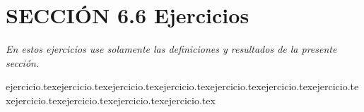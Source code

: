 
\section*{SECCIÓN 6.6 \quad Ejercicios}

\noindent \textit{En estos ejercicios use solamente las definiciones y resultados de la presente sección.}

\begin{enumerate}
    {ejercicio.tex}{ejercicio.tex}{ejercicio.tex}{ejercicio.tex}{ejercicio.tex}{ejercicio.tex}{ejercicio.tex}{ejercicio.tex}{ejercicio.tex}{ejercicio.tex}{ejercicio.tex}\end{enumerate}